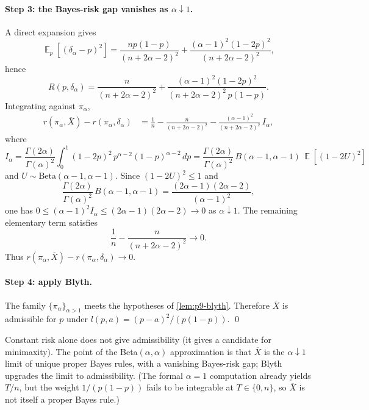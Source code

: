 \documentclass[11pt,a4paper]{article}
\DeclareMathOperator{\E}{\mathbb{E}}
\begin{document}
\paragraph{Step 3: the Bayes-risk gap vanishes as \(\alpha\downarrow 1\).}
A direct expansion gives
\[
\E_p[(\delta_\alpha-p)^2]
=
\frac{np(1-p)}{(n+2\alpha-2)^2}
+
\frac{(\alpha-1)^2(1-2p)^2}{(n+2\alpha-2)^2},
\]
hence
\[
R(p,\delta_\alpha)
=
\frac{n}{(n+2\alpha-2)^2}
+
\frac{(\alpha-1)^2(1-2p)^2}{(n+2\alpha-2)^2\,p(1-p)}.
\]
Integrating against \(\pi_\alpha\),
\begin{align*}
r(\pi_\alpha,\overline{X})-r(\pi_\alpha,\delta_\alpha)
&=
\frac1n
-
\frac{n}{(n+2\alpha-2)^2}
-
\frac{(\alpha-1)^2}{(n+2\alpha-2)^2}\,I_\alpha,
\end{align*}
where
\[
I_\alpha
=
\frac{\Gamma(2\alpha)}{\Gamma(\alpha)^2}
\int_0^1(1-2p)^2\,p^{\alpha-2}(1-p)^{\alpha-2}\,dp
=
\frac{\Gamma(2\alpha)}{\Gamma(\alpha)^2}\,B(\alpha-1,\alpha-1)\,\E[(1-2U)^2]
\]
and \(U\sim\mathrm{Beta}(\alpha-1,\alpha-1)\). Since \((1-2U)^2\le 1\) and
\[
\frac{\Gamma(2\alpha)}{\Gamma(\alpha)^2}\,B(\alpha-1,\alpha-1)
=
\frac{(2\alpha-1)(2\alpha-2)}{(\alpha-1)^2},
\]
one has \(0\le(\alpha-1)^2 I_\alpha\le(2\alpha-1)(2\alpha-2)\to 0\) as \(\alpha\downarrow 1\). The remaining elementary term satisfies
\[
\frac1n-\frac{n}{(n+2\alpha-2)^2}
\to
0.
\]
Thus \(r(\pi_\alpha,\overline{X})-r(\pi_\alpha,\delta_\alpha)\to 0\).

\paragraph{Step 4: apply Blyth.}
The family \(\{\pi_\alpha\}_{\alpha>1}\) meets the hypotheses of \cref{lem:p9-blyth}. Therefore \(\overline{X}\) is admissible for \(p\) under \(l(p,a)=(p-a)^2/(p(1-p))\).
\qed

\begin{remark*}
Constant risk alone does not give admissibility (it gives a candidate for minimaxity). The point of the Beta\((\alpha,\alpha)\) approximation is that \(\overline{X}\) is the \(\alpha\downarrow 1\) limit of unique proper Bayes rules, with a vanishing Bayes-risk gap; Blyth upgrades the limit to admissibility. (The formal \(\alpha=1\) computation already yields \(T/n\), but the weight \(1/(p(1-p))\) fails to be integrable at \(T\in\{0,n\}\), so \(\overline{X}\) is not itself a proper Bayes rule.)
\end{remark*}
\end{document}
